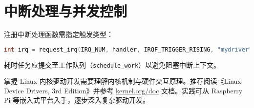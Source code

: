 \section{中断处理与并发控制}
注册中断处理函数需指定触发类型：\par
\begin{lstlisting}[language=c]
int irq = request_irq(IRQ_NUM, handler, IRQF_TRIGGER_RISING, "mydriver", NULL);  
\end{lstlisting}
耗时任务应提交至工作队列（\verb!schedule_work!）以避免阻塞中断上下文。\par
掌握 Linux 内核驱动开发需要理解内核机制与硬件交互原理。推荐阅读《Linux Device Drivers, 3rd Edition》并参考 \href{https://www.kernel.org/doc/}{kernel.org/doc} 文档。实践可从 Raspberry Pi 等嵌入式平台入手，逐步深入复杂驱动开发。\par
